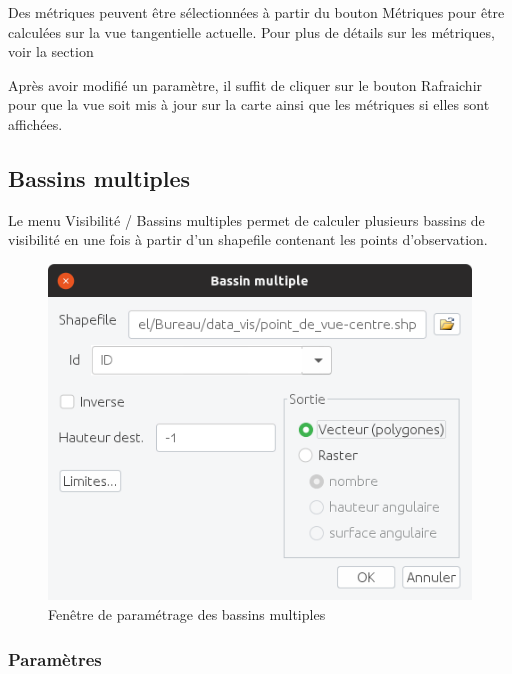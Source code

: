 \documentclass{report}
\begin{document}
Des métriques peuvent être sélectionnées à partir du bouton Métriques pour être calculées sur la vue tangentielle actuelle. Pour plus de détails sur les métriques, voir la section 

Après avoir modifié un paramètre, il suffit de cliquer sur le bouton Rafraichir pour que la vue soit mis à jour sur la carte ainsi que les métriques si elles sont affichées.

\subsection{Bassins multiples}
\label{multi_viewshed}
Le menu Visibilité / Bassins multiples permet de calculer plusieurs bassins de visibilité en une fois à partir d'un shapefile contenant les points d'observation.

\begin{figure}[H]
	\includegraphics[scale=0.5]{img/multi_viewshed-fr.png} 
	\caption{Fenêtre de paramétrage des bassins multiples}
	\label{multi_viewshed_dlg}
\end{figure}

\subsubsection{Paramètres}
\end{document}

